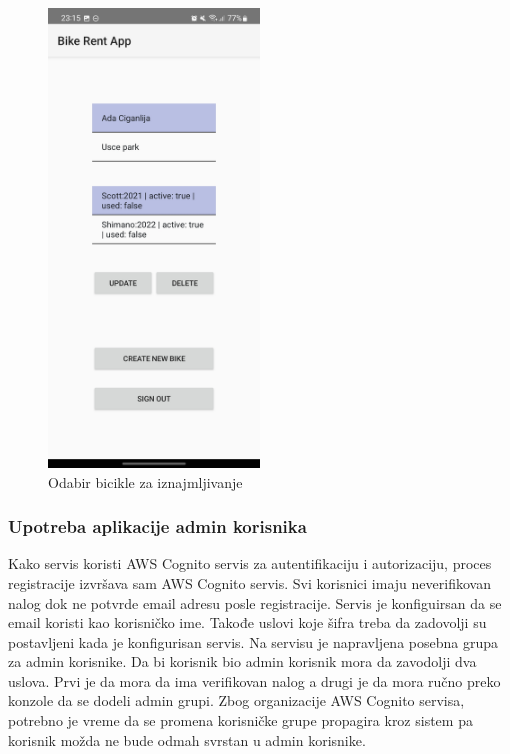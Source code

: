 \documentclass[12pt,oneside]{memoir}
\begin{document}
\begin{figure}[!ht]
  \centering
  \includegraphics[width=0.5\textwidth]{Odabir bicikle za iznajmljivanje.jpg}
  \caption{Odabir bicikle za iznajmljivanje}
  \label{fig:odabirBicikle}
\end{figure}
 
\subsubsection{Upotreba aplikacije admin korisnika}

Kako servis koristi AWS Cognito servis za autentifikaciju i autorizaciju, proces registracije izvršava sam AWS Cognito servis. Svi korisnici imaju neverifikovan nalog dok ne potvrde email adresu posle registracije. Servis je konfiguirsan da se email koristi kao korisničko ime. Takođe uslovi koje šifra treba da zadovolji su postavljeni kada je konfigurisan servis. Na servisu je napravljena posebna grupa za admin korisnike. Da bi korisnik bio admin korisnik mora da zavodolji dva uslova. Prvi je da mora da ima verifikovan nalog a drugi je da mora ručno preko konzole da se dodeli admin grupi. Zbog organizacije AWS Cognito servisa, potrebno je vreme da se promena korisničke grupe propagira kroz sistem pa korisnik možda ne bude odmah svrstan u admin korisnike.
 
\end{document}
